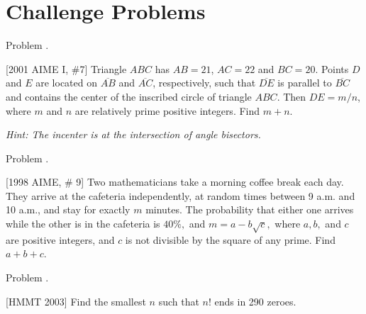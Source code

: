 \documentclass[9pt]{beamer}
\newcounter{problem}[section]
\begin{document}
\section{Challenge Problems}
\begin{frame}[t, fragile]{Problem \thesection.\theproblem}
    \begin{block}{}[2001 AIME I, \#7]
    Triangle $ABC$ has $AB=21$, $AC=22$ and $BC=20$. Points $D$ and $E$ are located on $\overline{AB}$ and $\overline{AC}$, respectively, such that $\overline{DE}$ is parallel to $\overline{BC}$ and contains the center of the inscribed circle of triangle $ABC$. Then $DE=m/n$, where $m$ and $n$ are relatively prime positive integers. Find $m+n$.	

    \textit{Hint: The incenter is at the intersection of angle bisectors.}

	
    \end{block}
\end{frame}

\begin{frame}[t, fragile]{Problem \thesection.\theproblem}
    \begin{block}{}[1998 AIME, \# 9]
    Two mathematicians take a morning coffee break each day. They arrive at the cafeteria independently, at random times between 9 a.m. and 10 a.m., and stay for exactly $m$ minutes. The probability that either one arrives while the other is in the cafeteria is $40 \%,$ and $m = a - b\sqrt {c},$ where $a, b,$ and $c$ are positive integers, and $c$ is not divisible by the square of any prime. Find $a + b + c.$
	
	
    \end{block}
\end{frame}

\begin{frame}[t, fragile]{Problem \thesection.\theproblem}
    \begin{block}{}[HMMT 2003]
    Find the smallest $n$ such that $n!$ ends in 290 zeroes.
	
	
    \end{block}
\end{frame}
\end{document}
